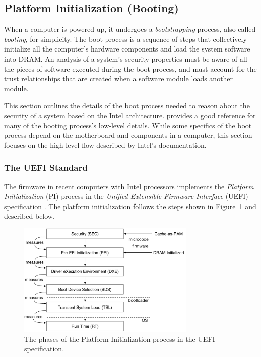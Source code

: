 \subsection{Platform Initialization (Booting)}
\label{sec:booting}


When a computer is powered up, it undergoes a \textit{bootstrapping} process,
also called \textit{booting}, for simplicity. The boot process is a sequence of
steps that collectively initialize all the computer's hardware components and
load the system software into DRAM. An analysis of a system's security
properties must be aware of all the pieces of software executed during the boot
process, and must account for the trust relationships that are created when a
software module loads another module.

This section outlines the details of the boot process needed to reason about
the security of a system based on the Intel architecture.
\cite{intel2010booting} provides a good reference for many of the booting
process's low-level details. While some specifics of the boot process depend on
the motherboard and components in a computer, this section focuses on the
high-level flow described by Intel's documentation.


\subsubsection{The UEFI Standard}
\label{sec:efi}

The firmware in recent computers with Intel processors implements the
\textit{Platform Initialization} (PI) process in the \textit{Unified
Extensible Firmware Interface} (UEFI) specification \cite{forum2015uefi}. The
platform initialization follows the steps shown in Figure~\ref{fig:uefi} and
described below.

\begin{figure}[hbt]
  \centering
  \includegraphics[width=85mm]{figures/uefi.pdf}
  \caption{
    The phases of the Platform Initialization process in the UEFI
    specification.
  }
  \label{fig:uefi}
\end{figure}

